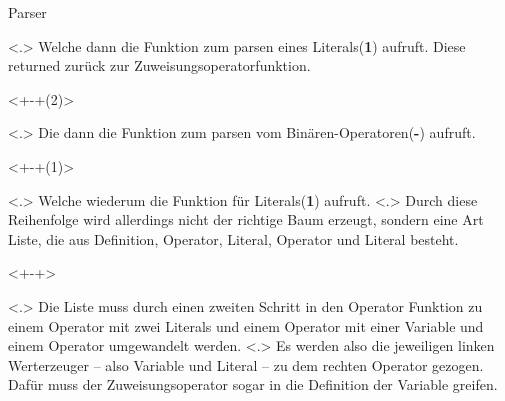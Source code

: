 \begin{frame}{Parser}
\begin{itemize}[<+- | alert@+>]
\begin{uncoverenv}
%
        \end{uncoverenv}
            \note[item]<.>{
              Welche dann die Funktion zum parsen eines Literals(\textbf{1}) aufruft. Diese returned zurück zur Zuweisungsoperatorfunktion.
            }
        \begin{uncoverenv}<+-+(2)>%
        \end{uncoverenv}
            \note[item]<.>{
              Die dann die Funktion zum parsen vom Binären-Operatoren(\textbf{-}) aufruft.
            }
        \begin{uncoverenv}<+-+(1)>%
        \end{uncoverenv}
            \note[item]<.>{
              Welche wiederum die Funktion für Literals(\textbf{1}) aufruft.
            }
            \note[item]<.>{
              Durch diese Reihenfolge wird allerdings nicht der richtige Baum erzeugt, sondern eine Art Liste, die aus Definition, Operator, Literal, Operator und Literal besteht.
            }
        \begin{uncoverenv}<+-+>%
        \end{uncoverenv}
            \note[item]<.>{
              Die Liste muss durch einen zweiten Schritt in den Operator Funktion zu einem Operator mit zwei Literals und einem Operator mit einer Variable und einem Operator umgewandelt werden.
            }
            \note[item]<.>{
              Es werden also die jeweiligen linken Werterzeuger -- also Variable und Literal -- zu dem rechten Operator gezogen. Dafür muss der Zuweisungsoperator sogar in die Definition der Variable greifen.
}
\end{itemize}
\end{frame}
